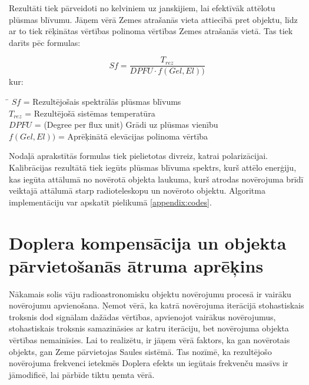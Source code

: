 Rezultāti tiek pārveidoti no kelviniem uz janskijiem, lai efektīvāk attēlotu plūsmas blīvumu. Jāņem vērā Zemes atrašanās vieta attiecībā pret objektu, līdz ar to tiek rēķinātas vērtības polinoma vērtības Zemes atrašanās vietā. Tas tiek darīts pēc formulas:

\begin{equation}
Sf = \frac{T_{rez}}{ DPFU \cdot f(Gel,El))}\tag{1.2.11}\label{eq:1.2.11} 
\end{equation}
kur:
\begin{tabbing}
\phantom{\hspace{30mm}}\= \kill
$Sf$\>  = Rezultējošais spektrālās plūsmas blīvums\\
$T_{rez}$\>  = Rezultējošā sistēmas temperatūra\\
$DPFU$\>  = (Degree per flux unit) Grādi uz plūsmas vienību\\
$f(Gel,El))$\>  = Aprēķinātā elevācijas polinoma vērtība \\
\end{tabbing}

Nodaļā aprakstītās formulas tiek pielietotas divreiz, katrai polarizācijai.
Kalibrācijas rezultātā tiek iegūts plūsmas blīvuma spektrs, kurš attēlo enerģiju, kas iegūta attālumā no novērotā objekta laukuma, kurš atrodas novērojuma brīdī veiktajā attālumā starp radioteleskopu un novēroto objektu. Algoritma implementāciju var apskatīt pielikumā \ref{appendix:codes}.



\section{Doplera kompensācija un objekta pārvietošanās ātruma aprēķins} \label{doppler}
Nākamais solis vāju radioastronomisku objektu novērojumu procesā ir vairāku novērojumu apvienošana. Ņemot vērā, ka katrā novērojuma iterācijā stohastiskais troksnis dod signālam dažādas vērtības, apvienojot vairākus novērojumus, stohastiskais troksnis samazināsies ar katru iterāciju, bet novērojuma objekta vērtības nemainīsies.  Lai to realizētu, ir jāņem vērā faktors, ka gan novērotais objekts, gan Zeme pārvietojas Saules sistēmā. Tas nozīmē, ka rezultējošo novērojuma frekvenci ietekmēs Doplera efekts un iegūtais frekvenču masīvs ir jāmodificē, lai pārbīde tiktu ņemta vērā. 

